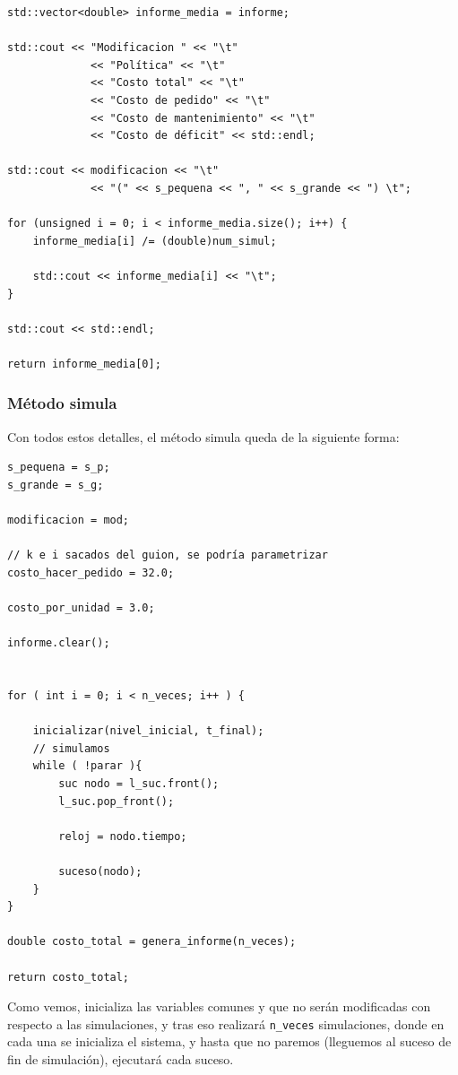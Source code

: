 \documentclass[12pt, spanish]{article}
\begin{document}
\begin{lstlisting}
std::vector<double> informe_media = informe;

std::cout << "Modificacion " << "\t"
			 << "Política" << "\t"
			 << "Costo total" << "\t"
			 << "Costo de pedido" << "\t"
			 << "Costo de mantenimiento" << "\t"
			 << "Costo de déficit" << std::endl;

std::cout << modificacion << "\t"
			 << "(" << s_pequena << ", " << s_grande << ") \t";

for (unsigned i = 0; i < informe_media.size(); i++) {
	informe_media[i] /= (double)num_simul;

	std::cout << informe_media[i] << "\t";
}

std::cout << std::endl;

return informe_media[0];
\end{lstlisting}


\subsubsection{Método simula}

Con todos estos detalles, el método simula queda de la siguiente forma:

\begin{lstlisting}
s_pequena = s_p;
s_grande = s_g;

modificacion = mod;

// k e i sacados del guion, se podría parametrizar
costo_hacer_pedido = 32.0;

costo_por_unidad = 3.0;

informe.clear();


for ( int i = 0; i < n_veces; i++ ) {

	inicializar(nivel_inicial, t_final);
	// simulamos
	while ( !parar ){
		suc nodo = l_suc.front();
		l_suc.pop_front();

		reloj = nodo.tiempo;

		suceso(nodo);
	}
}

double costo_total = genera_informe(n_veces);

return costo_total;
\end{lstlisting}

Como vemos, inicializa las variables comunes y que no serán modificadas con respecto a las simulaciones, y tras eso realizará \texttt{n\_veces} simulaciones, donde en cada una se inicializa el sistema, y hasta que no paremos (lleguemos al suceso de fin de simulación), ejecutará cada suceso.
\end{document}
